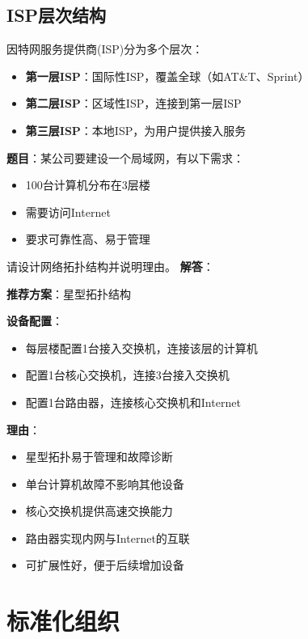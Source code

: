 \subsection{ISP层次结构}
因特网服务提供商(ISP)分为多个层次：
\begin{itemize}[leftmargin=2em,itemsep=0pt]
    \item \textbf{第一层ISP}：国际性ISP，覆盖全球（如AT\&T、Sprint）
    \item \textbf{第二层ISP}：区域性ISP，连接到第一层ISP
    \item \textbf{第三层ISP}：本地ISP，为用户提供接入服务
\end{itemize}

\begin{examplebox}[例题1.5 综合题]
\textbf{题目}：某公司要建设一个局域网，有以下需求：
\begin{itemize}[itemsep=0pt]
    \item 100台计算机分布在3层楼
    \item 需要访问Internet
    \item 要求可靠性高、易于管理
\end{itemize}
请设计网络拓扑结构并说明理由。
\tcblower
\textbf{解答}：

\textbf{推荐方案}：星型拓扑结构

\textbf{设备配置}：
\begin{itemize}[itemsep=0pt]
    \item 每层楼配置1台接入交换机，连接该层的计算机
    \item 配置1台核心交换机，连接3台接入交换机
    \item 配置1台路由器，连接核心交换机和Internet
\end{itemize}

\textbf{理由}：
\begin{itemize}[itemsep=0pt]
    \item 星型拓扑易于管理和故障诊断
    \item 单台计算机故障不影响其他设备
    \item 核心交换机提供高速交换能力
    \item 路由器实现内网与Internet的互联
    \item 可扩展性好，便于后续增加设备
\end{itemize}
\end{examplebox}

\section{标准化组织}
